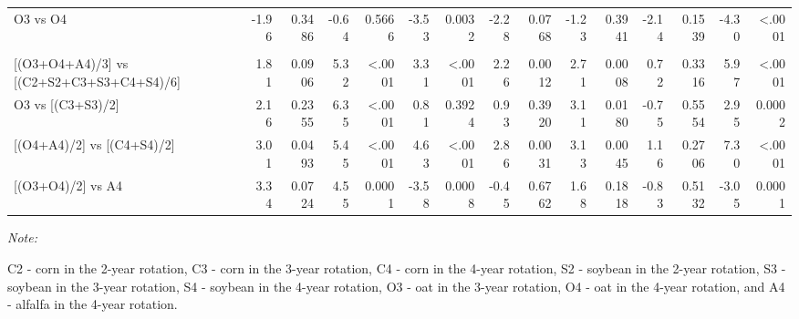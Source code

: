 \documentclass[
]{article}
\begin{document}
\begin{landscape}
\begin{table}
{\begin{threeparttable}
\begin{tabular}[t]{lr>{}r|r>{}r|r>{}r|r>{}r|r>{}r|r>{}r|rr}
\hspace{1em}\hspace{1em}O3 vs O4 & -1.96 & 0.3486 & -0.64 & 0.5666 & -3.53 & 0.0032 & -2.28 & 0.0768 & -1.23 & 0.3941 & -2.14 & 0.1539 & -4.30 & <.0001\\
\addlinespace[0.3em]
\multicolumn{15}{l}{\textbf{(B3) - Crop type effects}}\\
\hspace{1em}\hspace{1em}{}[(O3+O4+A4)/3] vs [(C2+S2+C3+S3+C4+S4)/6] & 1.81 & 0.0906 & 5.32 & <.0001 & 3.31 & <.0001 & 2.26 & 0.0012 & 2.71 & 0.0008 & 0.72 & 0.3316 & 5.97 & <.0001\\
\hspace{1em}\hspace{1em}O3 vs [(C3+S3)/2] & 2.16 & 0.2355 & 6.35 & <.0001 & 0.81 & 0.3924 & 0.93 & 0.3920 & 3.11 & 0.0180 & -0.75 & 0.5554 & 2.95 & 0.0002\\
\hspace{1em}\hspace{1em}{}[(O4+A4)/2] vs [(C4+S4)/2] & 3.01 & 0.0493 & 5.45 & <.0001 & 4.63 & <.0001 & 2.86 & 0.0031 & 3.13 & 0.0045 & 1.16 & 0.2706 & 7.30 & <.0001\\
\hspace{1em}\hspace{1em}{}[(O3+O4)/2] vs A4 & 3.34 & 0.0724 & 4.55 & 0.0001 & -3.58 & 0.0008 & -0.45 & 0.6762 & 1.68 & 0.1818 & -0.83 & 0.5132 & -3.05 & 0.0001\\
\bottomrule
\end{tabular}
\begin{tablenotes}[para]
\item \textit{Note: } 
\item C2 - corn in the 2-year rotation, C3 - corn in the 3-year rotation, C4 - corn in the 4-year rotation, S2 - soybean in the 2-year rotation, S3 - soybean in the 3-year rotation, S4 - soybean in the 4-year rotation, O3 - oat in the 3-year rotation, O4 - oat in the 4-year rotation, and A4 - alfalfa in the 4-year rotation.
\end{tablenotes}
\end{threeparttable}}
\end{table}
\end{landscape}
\end{document}
